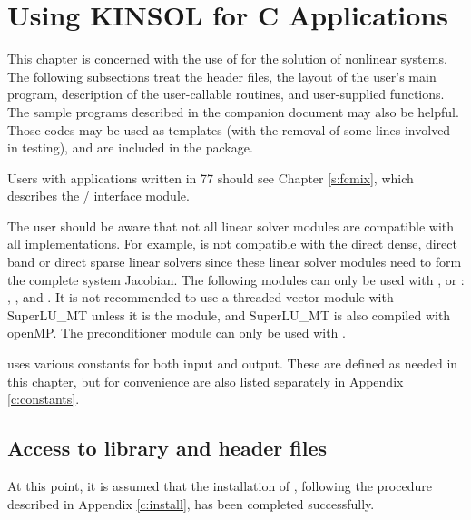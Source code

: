 \chapter{Using KINSOL for C Applications}\label{c:usage}

This chapter is concerned with the use of {\kinsol} for the solution
of nonlinear systems. The following subsections treat the header
files, the layout of the user's main program, description of the
{\kinsol} user-callable routines, and user-supplied functions.
The sample programs described in the companion document
\cite{kinsol_ex} may also be helpful.  Those codes may be used as
templates (with the removal of some lines involved in testing), and
are included in the {\kinsol} package.

Users with applications written in {\F}77 should see Chapter \ref{s:fcmix},
which describes the {\F}/{\C} interface module.

The user should be aware that not all linear solver modules are compatible 
with all {\nvector} implementations. 
For example, {\nvecp} is not compatible with the direct dense, direct
band or direct sparse linear solvers since these linear solver modules
need to form the complete 
system Jacobian. The following {\kinsol} modules can only be used with
{\nvecs}, {\nvecopenmp} or {\nvecpthreads}:
{\kindense}, {\kinband}, {\kinklu} and {\kinsuperlumt}. 
It is not recommended to use a threaded vector module with SuperLU\_MT
unless it is the {\nvecopenmp} module, and SuperLU\_MT is also compiled
with openMP.
The preconditioner module {\kinbbdpre} can only be used with {\nvecp}.

{\kinsol} uses various constants for both input and output. These are
defined as needed in this chapter, but for convenience are also listed
separately in Appendix \ref{c:constants}.

\section{Access to library and header files}\label{ss:file_access}

At this point, it is assumed that the installation of {\kinsol},
following the procedure described in Appendix \ref{c:install}, has
been completed successfully.

